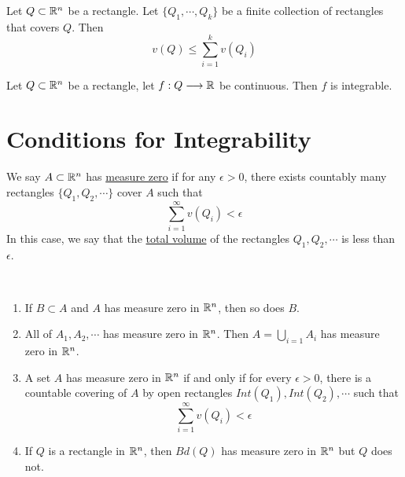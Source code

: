 \begin{theorem}\label{sum of subrectangles}
    Let $Q\subset \mathbb{R}^n$ be a rectangle. Let $\{Q_1,\cdots,Q_k\}$ be a finite collection of rectangles that covers $Q$. Then 
    $$v(Q)\leq \sum_{i=1}^kv(Q_i)$$
\end{theorem}

\begin{theorem}\label{continuous implies integrable}
    Let $Q\subset \mathbb{R}^n$ be a rectangle, let $f:Q \longrightarrow \mathbb{R}$ be continuous. Then $f$ is integrable.
\end{theorem}

\section{Conditions for Integrability}

\begin{definition}
    We say $A\subset \mathbb{R}^n$ has \underline{measure zero} if for any $\epsilon>0$, there exists countably many rectangles $\{Q_1,Q_2,\cdots\}$ cover $A$ such that
    $$\sum_{i=1}^{\infty}v(Q_i)<\epsilon$$
    In this case, we say that the \underline{total volume} of the rectangles $Q_1,Q_2,\cdots$ is less than $\epsilon$.
\end{definition}

\begin{theorem}\ \label{measure zero 4 theorems}
    \begin{enumerate}
        \item If $B \subset A$ and $A$ has measure zero in $\mathbb{R}^n$, then so does $B$.
        \item All of $A_1,A_2,\cdots$ has measure zero in $\mathbb{R}^n$. Then $A=\bigcup_{i=1}A_i$ has measure zero in $\mathbb{R}^n$.
        \item A set $A$ has measure zero in $\mathbb{R}^n$ if and only if for every $\epsilon > 0$, there is a countable covering of $A$ by open rectangles $Int(Q_1), Int(Q_2),\cdots$ such that $$\sum_{i=1}^{\infty}v(Q_i)<\epsilon$$
        \item If $Q$ is a rectangle in $\mathbb{R}^n$, then $Bd(Q)$ has measure zero in $\mathbb{R}^n$ but $Q$ does not.
    \end{enumerate}
\end{theorem}

